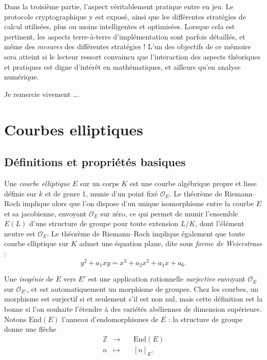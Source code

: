 \documentclass[11pt,a4paper]{article}
\newcommand{\Z}{\mathbb{Z}}
\renewcommand{\O}{\mathcal{O}}
\newcommand{\End}{\mathrm{End}}
\theoremstyle{definition}
\begin{document}
Dans la troisième partie, l'aspect véritablement pratique entre en jeu. Le protocole cryptographique y est exposé, ainsi que les différentes stratégies de calcul utilisées, plus ou moins intelligentes et optimisées. Lorsque cela est pertinent, les aspects terre-à-terre d'implémentation sont parfois détaillés, et même des \emph{mesures} des différentes stratégies !  L'un des objectifs de ce mémoire sera atteint si le lecteur ressort convaincu que l'interaction des aspects théoriques et pratiques est digne d'intérêt en mathématiques, et ailleurs qu'en analyse numérique.

Je remercie vivement \ldots.

\newpage

\tableofcontents

\newpage

\section{Courbes elliptiques}

\subsection{Définitions et propriétés basiques}

Une \emph{courbe elliptique} $E$ sur un corps $K$ est une courbe algébrique propre et lisse définie sur $k$ et de genre 1, munie d'un point fixé $\O_E$. Le théorème de Riemann--Roch implique alors que l'on dispose d'un unique isomorphisme entre la courbe $E$ et sa jacobienne, envoyant $\O_E$ sur zéro, ce qui permet de munir l'ensemble $E(L)$ d'une structure de groupe pour toute extension $L/K$, dont l'élément neutre est $\O_E$. Le théorème de Riemann--Roch implique également que toute courbe elliptique sur $K$ admet une équation plane, dite sous \emph{forme de Weierstrass} :
$$y^2 + a_1xy = x^3 + a_2x^2 + a_4 x + a_6.$$

Une \emph{isogénie} de $E$ vers $E'$ est une application rationnelle \emph{surjective} envoyant $\O_E$ sur $\O_{E'}$, et est automatiquement un morphisme de groupes. Chez les courbes, un morphisme est surjectif si et seulement s'il est non nul, mais cette définition est la bonne si l'on souhaite l'étendre à des variétés abéliennes de dimension supérieure. Notons $\End(E)$ l'anneau d'endomorphismes de $E$ : la structure de groupe donne une flèche
$$\begin{aligned}
&\Z &\longrightarrow&\ &\End(E) &\\
&n &\longmapsto& &[n]_E .\ \ &
\end{aligned}$$
\end{document}
